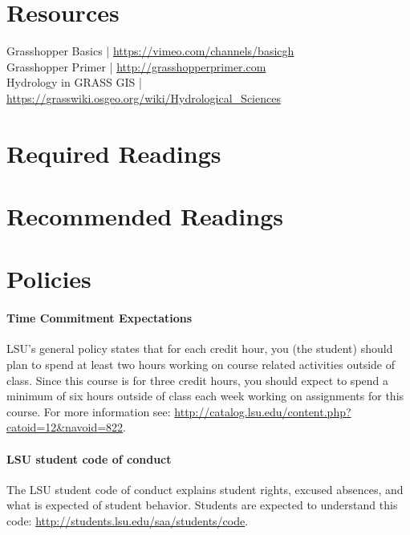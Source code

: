 \documentclass[11pt,article,oneside]{memoir}
\begin{document}
\section{Resources}

Grasshopper Basics | \url{https://vimeo.com/channels/basicgh}\\
Grasshopper Primer | \url{http://grasshopperprimer.com}\\
Hydrology in GRASS GIS | \url{https://grasswiki.osgeo.org/wiki/Hydrological_Sciences}\\

\section{Required Readings}
\vspace*{0.5cm}
\nocite{*}
\setlength{}
\printbibliography[keyword=required, heading=none]

\section{Recommended Readings}
\vspace*{0.5cm}
\nocite{*}
\setlength{}
\printbibliography[keyword=recommended, heading=none]

\section{Policies}

\paragraph{Time Commitment Expectations}
LSU's general policy states that for each credit hour, you (the student) should plan to
spend at least two hours working on course related activities outside of class. Since this course is for three credit hours, you should expect to spend a minimum of six hours outside of class each week working on assignments for this course. For more information see: 
\url{http://catalog.lsu.edu/content.php?catoid=12&navoid=822}.

\paragraph{LSU student code of conduct}
The LSU student code of conduct explains student rights, excused absences, and what is expected of student behavior. Students are expected to understand this code:  \url{http://students.lsu.edu/saa/students/code}.
\end{document}

